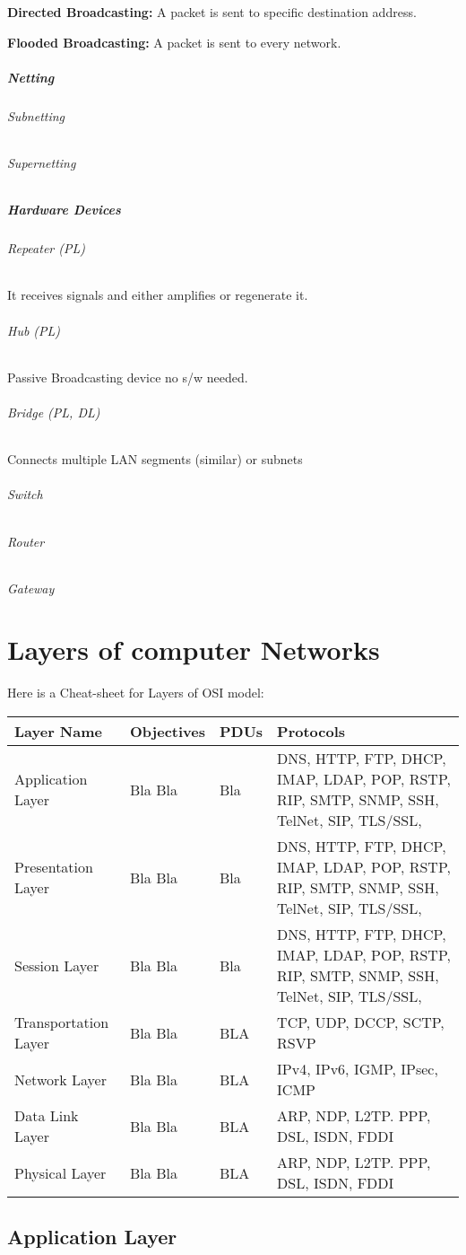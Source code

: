 \textbf{Directed Broadcasting:} A packet is sent to specific destination address.

\textbf{Flooded Broadcasting:} A packet is sent to every network.
\paragraph{Netting}
\subparagraph{Subnetting}
\subparagraph{Supernetting}
\paragraph{Hardware Devices}
\subparagraph{Repeater (PL)} It receives signals and either amplifies or regenerate it.
\subparagraph{Hub (PL)} Passive Broadcasting device no s/w needed.
\subparagraph{Bridge (PL, DL)} Connects multiple LAN segments (similar) or subnets 
\subparagraph{Switch}
\subparagraph{Router}
\subparagraph{Gateway}
\chapter{Layers of computer Networks}
Here is a Cheat-sheet for Layers of OSI model:\\
\begin{tabular}{|p{5em}|p{10em}|p{3em}|p{8em}|}
	\hline Layer Name & Objectives & PDUs & Protocols\\
	\hline Application Layer & Bla Bla & Bla & DNS, HTTP, FTP, DHCP, IMAP, LDAP, POP, RSTP, RIP, SMTP, SNMP, SSH, TelNet, SIP, TLS/SSL,\\
	\hline Presentation Layer & Bla Bla & Bla & DNS, HTTP, FTP, DHCP, IMAP, LDAP, POP, RSTP, RIP, SMTP, SNMP, SSH, TelNet, SIP, TLS/SSL,\\
	\hline Session Layer & Bla Bla & Bla & DNS, HTTP, FTP, DHCP, IMAP, LDAP, POP, RSTP, RIP, SMTP, SNMP, SSH, TelNet, SIP, TLS/SSL,\\
	\hline Transportation Layer & Bla Bla & BLA & TCP, UDP, DCCP, SCTP, RSVP\\
	\hline Network Layer & Bla Bla & BLA & IPv4, IPv6, IGMP, IPsec, ICMP\\
	\hline Data Link Layer & Bla Bla & BLA & ARP, NDP, L2TP. PPP, DSL, ISDN, FDDI \\
	\hline Physical Layer & Bla Bla & BLA & ARP, NDP, L2TP. PPP, DSL, ISDN, FDDI \\
	\hline
\end{tabular}
\section{Application Layer}
